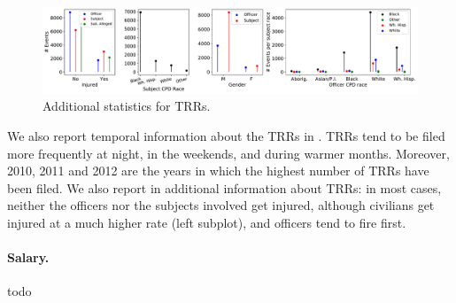 \begin{figure}[h] 
	\includegraphics[width=\textwidth]{figs/trr_stats} 
	\caption{Additional statistics for TRRs.} \label{fig:trrs_stats1}
\end{figure}

We also report temporal information about the TRRs in . TRRs tend to be filed more frequently at night, in the weekends, and during warmer months. Moreover, 2010, 2011 and 2012 are the years in which the highest number of TRRs have been filed. We also report in  additional information about TRRs: in most cases, neither the officers nor the subjects involved get injured, although civilians get injured at a much higher rate (left subplot), and officers tend to fire first. 
\paragraph{Salary.} todo

